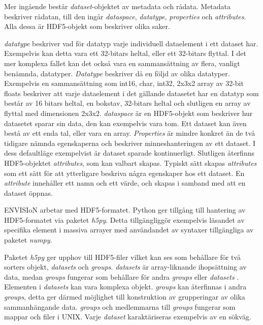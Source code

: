 
Mer ingående består \textit{dataset}-objektet av metadata och rådata. Metadata beskriver rådatan, till den ingår \textit{dataspace}, \textit{datatype}, \textit{properties} och \textit{attributes}. Alla dessa är HDF5-objekt som beskriver olika saker. 

\textit{datatype} beskriver vad för datatyp varje individuell dataelement i ett dataset har. Exempelvis kan detta vara ett 32-bitars heltal, eller ett 32-bitars flyttal. I det mer komplexa fallet kan det också vara en sammansättning av flera, vanligt benämnda, datatyper. \textit{Datatype} beskriver då en följd av olika datatyper. Exempelvis en sammansättning som int16, char, int32, 2x3x2 array av 32-bit floats beskriver att varje dataelement i det gällande datasetet har en datatyp som består av 16 bitars heltal, en bokstav, 32-bitars heltal och slutligen en array av flyttal med dimensionen 2x3x2. \textit{dataspace} är en HDF5-objekt som beskriver hur datasetet sparar sin data, den kan exempelvis vara tom. Ett dataset kan även bestå av ett enda tal, eller vara en array. 
\newpage
\textit{Properties} är mindre konkret än de två tidigare nämnda egenskaperna och beskriver minneshanteringen av ett dataset. I dess defaultläge exempelvist är dataset sparade kontinuerligt. Slutligen återfinns HDF5-objektet \textit{attributes}, som kan valbart skapas. Typiskt sätt skapas \textit{attributes} som ett sätt för att ytterligare beskriva några egenskaper hos ett dataset. En \textit{attribute} innehåller ett namn och ett värde, och skapas i samband med att en dataset öppnas. \cite{HDF group2}       



ENVISIoN arbetar med HDF5-formatet. Python ger tillgång till hantering av HDF5-formatet via paketet \textit{h5py}. Detta tillgängliggör exempelvis läsandet av specifika element i massiva arrayer med användandet av syntaxer tillgängliga av paketet \textit{numpy}. \cite{How To Use HDF5 Files in Python}

Paketet \textit{h5py} ger upphov till HDF5-filer vilket kan ses som behållare för två sorters objekt, \textit{datasets} och \textit{groups}. \textit{datasets} är array-liknande ihopsättning av data, medan \textit{groups} fungerar som behållare för andra \textit{groups} eller \textit{datasets} \cite{How To Use HDF5 Files in Python}. Elementen i \textit{datasets} kan vara komplexa objekt. \textit{groups} kan återfinnas i andra \textit{groups}, detta ger därmed möjlighet till konstruktion av grupperingar av olika sammanhängande data. \textit{groups} och medlemmarna till \textit{groups} fungerar som mappar och filer i UNIX. Varje \textit{dataset} karaktäriseras exempelvis av en sökväg. \cite{High Level Introduction to HDF5}

